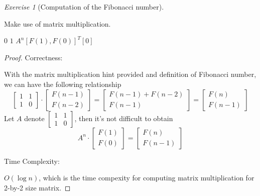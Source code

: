 \documentclass[a4paper,10pt,twoside]{article}
\theoremstyle{plain}
\theoremstyle{definition}
\theoremstyle{remark}
\newtheorem{exercise}{Exercise}
\begin{document}
\begin{exercise}[Computation of the Fibonacci number]\

Make use of matrix multiplication.
\begin{algorithm}[h]
	\caption{$Fib(n)$}
		{\Return $0$}
		{\Return $1$}
		{\Return $A^n [F(1), F(0)]^T[0]$}
\end{algorithm}

\begin{proof}
Correctness: 

With the matrix multiplication hint provided and definition of Fibonacci number, we can have the following relationship
\begin{equation}
	\begin{bmatrix}1 & 1\\ 1 & 0\end{bmatrix}\cdot
	\begin{bmatrix}F(n-1)\\F(n-2)\end{bmatrix}
	= \begin{bmatrix}F(n-1) + F(n-2)\\F(n-1)\end{bmatrix}
	= \begin{bmatrix}F(n)\\F(n-1)\end{bmatrix}
\end{equation}
Let $A$  denote $\begin{bmatrix}1 & 1\\ 1 & 0\end{bmatrix}$, then it's not difficult to obtain 
 \begin{equation}
	A^n \cdot \begin{bmatrix}F(1)\\F(0)\end{bmatrix} = \begin{bmatrix}F(n)\\F(n-1)\end{bmatrix}
\end{equation}

Time Complexity:

$O(\log n)$, which is the time compexity for computing matrix multiplication for 2-by-2 size matrix.
\end{proof}
\end{exercise}
\end{document}

